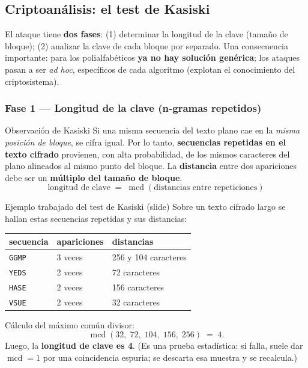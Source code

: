 \documentclass[11pt,a4paper]{article}
\DeclareMathOperator{\mcd}{mcd}
\begin{document}
\subsection{Criptoanálisis: el test de Kasiski}
El ataque tiene \textbf{dos fases}: (1) determinar la longitud de la clave (tamaño de bloque);
(2) analizar la clave de cada bloque por separado. Una consecuencia importante: para los
polialfabéticos \textbf{ya no hay solución genérica}; los ataques pasan a ser
\emph{ad hoc}, específicos de cada algoritmo (explotan el conocimiento del criptosistema).

\subsubsection{Fase 1 — Longitud de la clave (n-gramas repetidos)}
\begin{defbox}{Observación de Kasiski}
Si una misma secuencia del texto plano cae en la \emph{misma posición de bloque}, se cifra
igual. Por lo tanto, \textbf{secuencias repetidas en el texto cifrado} provienen, con alta
probabilidad, de los mismos caracteres del plano alineados al mismo punto del bloque. La
\textbf{distancia} entre dos apariciones debe ser un \textbf{múltiplo del tamaño de bloque}.
\[
  \text{longitud de clave} \;=\; \mcd(\text{distancias entre repeticiones})
\]
\end{defbox}

\begin{practbox}{Ejemplo trabajado del test de Kasiski (slide)}
Sobre un texto cifrado largo se hallan estas secuencias repetidas y sus distancias:
\begin{center}
\renewcommand{\arraystretch}{1.15}
\begin{tabular}{lll}
\toprule
secuencia & apariciones & distancias\\
\midrule
\texttt{GGMP} & 3 veces & 256 y 104 caracteres\\
\texttt{YEDS} & 2 veces & 72 caracteres\\
\texttt{HASE} & 2 veces & 156 caracteres\\
\texttt{VSUE} & 2 veces & 32 caracteres\\
\bottomrule
\end{tabular}
\end{center}
Cálculo del máximo común divisor:
\[
  \mcd(32,\;72,\;104,\;156,\;256) \;=\; 4 .
\]
Luego, la \textbf{longitud de clave es 4}. (Es una prueba estadística: si falla, suele dar
$\mcd=1$ por una coincidencia espuria; se descarta esa muestra y se recalcula.)
\end{practbox}
\end{document}
